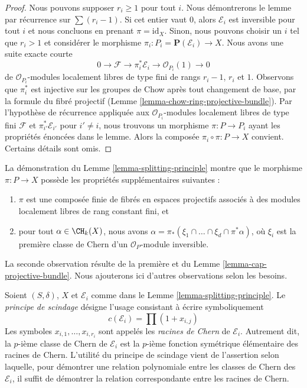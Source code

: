 \begin{proof}
Nous pouvons supposer $r_i \geq 1$ pour tout $i$. Nous démontrerons le lemme par récurrence
sur $\sum (r_i - 1)$. Si cet entier vaut $0$, alors $\mathcal{E}_i$
est inversible pour tout $i$ et nous concluons en prenant $\pi = \text{id}_X$.
Sinon, nous pouvons choisir un $i$ tel que $r_i > 1$ et considérer le
morphisme $\pi_i : P_i = \mathbf{P}(\mathcal{E}_i) \to X$.
Nous avons une suite exacte courte
$$
0 \to \mathcal{F} \to \pi_i^*\mathcal{E}_i \to \mathcal{O}_{P_i}(1) \to 0
$$
de $\mathcal{O}_{P_i}$-modules localement libres de type fini de rangs $r_i - 1$,
$r_i$ et $1$. Observons que $\pi_i^*$ est injective sur les groupes de Chow
après tout changement de base, par la formule du fibré projectif
(Lemme \ref{lemma-chow-ring-projective-bundle}).
Par l'hypothèse de récurrence appliquée aux
$\mathcal{O}_{P_i}$-modules localement libres de type fini $\mathcal{F}$ et $\pi_{i'}^*\mathcal{E}_{i'}$
pour $i' \not = i$, nous trouvons un morphisme $\pi : P \to P_i$ ayant
les propriétés énoncées dans le lemme. Alors la composée
$\pi_i \circ \pi : P \to X$ convient. Certains détails sont omis.
\end{proof}

\begin{remark}
\label{remark-the-proof-shows-more}
La démonstration du Lemme \ref{lemma-splitting-principle}
montre que le morphisme $\pi : P \to X$ possède les propriétés supplémentaires
suivantes :
\begin{enumerate}
\item $\pi$ est une composée finie de fibrés en espaces projectifs
associés à des modules localement libres de rang constant fini, et
\item pour tout $\alpha \in \CH_k(X)$, nous avons
$\alpha = \pi_*(\xi_1 \cap \ldots \cap \xi_d \cap \pi^*\alpha)$,
où $\xi_i$ est la première classe de Chern d'un
$\mathcal{O}_P$-module inversible.
\end{enumerate}
La seconde observation résulte de la première et du
Lemme \ref{lemma-cap-projective-bundle}.
Nous ajouterons ici d'autres observations selon les besoins.
\end{remark}

\noindent
Soient $(S, \delta)$, $X$ et $\mathcal{E}_i$ comme dans le
Lemme \ref{lemma-splitting-principle}.
Le {\it principe de scindage} désigne l'usage consistant à écrire symboliquement
$$
c(\mathcal{E}_i) = \prod (1 + x_{i, j})
$$
Les symboles $x_{i, 1}, \ldots, x_{i, r_i}$ sont appelés les {\it racines de Chern}
de $\mathcal{E}_i$. Autrement dit, la $p$-ième classe de Chern de $\mathcal{E}_i$
est la $p$-ième fonction symétrique élémentaire des racines de Chern.
L'utilité du principe de scindage vient de l'assertion selon laquelle,
pour démontrer une relation polynomiale entre les classes de Chern des
$\mathcal{E}_i$, il suffit de démontrer la relation correspondante entre les
racines de Chern.

